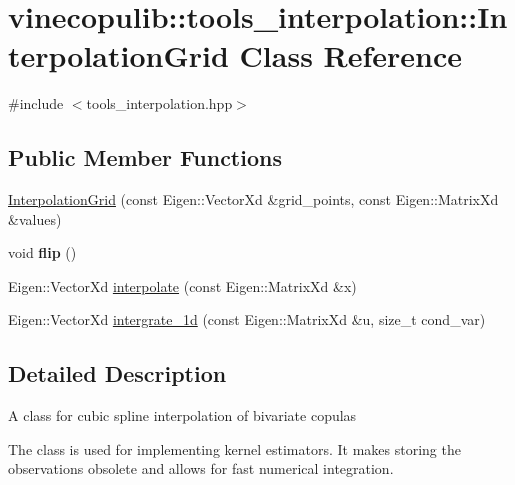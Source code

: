 \hypertarget{classvinecopulib_1_1tools__interpolation_1_1_interpolation_grid}{}\section{vinecopulib\+:\+:tools\+\_\+interpolation\+:\+:Interpolation\+Grid Class Reference}
\label{classvinecopulib_1_1tools__interpolation_1_1_interpolation_grid}


{\ttfamily \#include $<$tools\+\_\+interpolation.\+hpp$>$}

\subsection*{Public Member Functions}
\begin{DoxyCompactItemize}
\item 
\hyperlink{classvinecopulib_1_1tools__interpolation_1_1_interpolation_grid_a2cc351aee4b943dba785881b893b35b2}{Interpolation\+Grid} (const Eigen\+::\+Vector\+Xd \&grid\+\_\+points, const Eigen\+::\+Matrix\+Xd \&values)
\item 
void {\bfseries flip} ()\hypertarget{classvinecopulib_1_1tools__interpolation_1_1_interpolation_grid_a9eec97102cfbb146cda8f6f4d4fc0794}{}\label{classvinecopulib_1_1tools__interpolation_1_1_interpolation_grid_a9eec97102cfbb146cda8f6f4d4fc0794}

\item 
Eigen\+::\+Vector\+Xd \hyperlink{classvinecopulib_1_1tools__interpolation_1_1_interpolation_grid_adee449dd69cee82748f02f9133069fc1}{interpolate} (const Eigen\+::\+Matrix\+Xd \&x)
\item 
Eigen\+::\+Vector\+Xd \hyperlink{classvinecopulib_1_1tools__interpolation_1_1_interpolation_grid_abe7711ab9183964ce99f43dccb097299}{intergrate\+\_\+1d} (const Eigen\+::\+Matrix\+Xd \&u, size\+\_\+t cond\+\_\+var)
\end{DoxyCompactItemize}


\subsection{Detailed Description}
A class for cubic spline interpolation of bivariate copulas

The class is used for implementing kernel estimators. It makes storing the observations obsolete and allows for fast numerical integration. 

